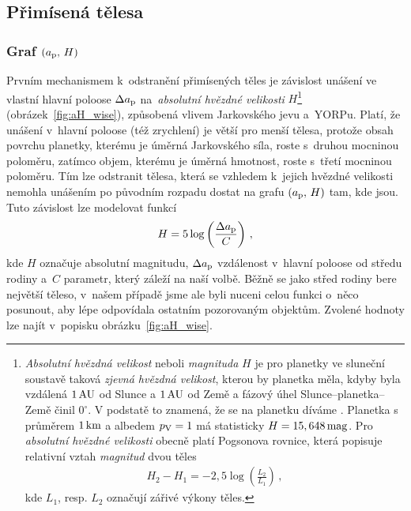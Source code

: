 \documentclass[A4paper, 12pt, oneside]{book}
\begin{document}
\subsection{Přimísená tělesa} \label{sec:interlopers}

\subsubsection{Graf $(a_{\rm p},\,H)$}
Prvním mechanismem k~odstranění přimísených těles je závislost unášení ve vlastní hlavní poloose $\Delta a_{\rm p}$ na~\textit{absolutní hvězdné velikosti} $H$\footnote{\textit{Absolutní hvězdná velikost} neboli \textit{magnituda} $H$ je pro planetky ve sluneční soustavě taková \textit{zjevná hvězdná velikost}, kterou by planetka měla, kdyby byla vzdálená $1\,{\rm AU}$ od Slunce a $1\,{\rm AU}$ od Země a fázový úhel Slunce--planetka--Země činil $0^\circ$. V podstatě to znamená, že se na planetku díváme . Planetka s průměrem $1\,{\rm km}$ a albedem $p_{\rm V}=1$ má statisticky $H=15,648\,{\rm mag}$. Pro \textit{absolutní hvězdné velikosti} obecně platí Pogsonova rovnice, která popisuje relativní vztah \textit{magnitud} dvou těles
\begin{align*}
	H_2-H_1=-2,5\log\left(\frac{L_2}{L_1}\right)\,,
\end{align*}
kde $L_1$, resp. $L_2$ označují zářivé výkony těles.}
(obrázek~\ref{fig:aH_wise}), způsobená vlivem Jarkovského jevu a~YORPu. Platí, že unášení v~hlavní poloose (též zrychlení) je větší pro menší tělesa, protože obsah povrchu planetky, kterému je úměrná Jarkovského síla, roste s~druhou mocninou poloměru, zatímco objem, kterému je úměrná hmotnost, roste s~třetí mocninou poloměru. Tím lze odstranit tělesa, která se vzhledem k~jejich hvězdné velikosti nemohla unášením po původním rozpadu dostat na grafu $(a_{\rm p},\,H)$ tam, kde jsou. Tuto závislost lze modelovat funkcí 
\begin{align}
	H=5\log\left(\frac{\Delta a_{\rm p}}{C}\right)\,,
\end{align}
kde $H$ označuje absolutní magnitudu, $\Delta a_{\rm p}$ vzdálenost v~hlavní poloose od středu rodiny a~$C$ parametr, který záleží na naší volbě. Běžně se jako střed rodiny bere největší těleso, v~našem případě jsme ale byli nuceni celou funkci o~něco posunout, aby lépe odpovídala ostatním pozorovaným objektům. Zvolené hodnoty lze najít v~popisku obrázku~\ref{fig:aH_wise}.
\end{document}
